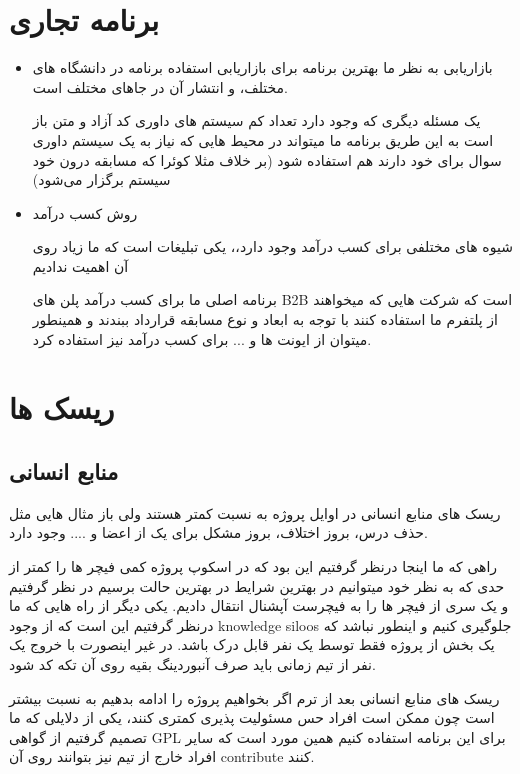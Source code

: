 \documentclass{article}
\begin{document}
		\section{برنامه تجاری}
		\begin{itemize}
			\item بازاریابی
			به نظر ما بهترین برنامه برای بازاریابی استفاده برنامه در دانشگاه های مختلف، و انتشار آن در جاهای مختلف است.
			
			یک مسئله دیگری که وجود دارد تعداد کم سیستم های داوری کد آزاد و متن باز است  به این طریق برنامه ما میتواند در محیط هایی که نیاز به یک سیستم داوری سوال برای خود دارند هم استفاده شود (بر خلاف مثلا کوئرا که مسابقه درون خود سیستم برگزار می‌شود)
			\item روش کسب درآمد
			
			شیوه های مختلفی برای کسب درآمد وجود دارد،، یکی تبلیغات است که ما زیاد روی آن اهمیت ندادیم
			
			برنامه اصلی ما برای کسب درآمد پلن های B2B است که شرکت هایی که میخواهند از پلتفرم ما استفاده کنند با توجه به ابعاد و نوع مسابقه قرارداد ببندند و همینطور میتوان از ایونت ها و ... برای کسب درآمد نیز استفاده کرد.
		\end{itemize}
		
		\section{ریسک ها}
		\subsection{منابع انسانی}
		ریسک های منابع انسانی در اوایل پروژه به نسبت کمتر هستند ولی باز مثال هایی مثل حذف درس، بروز اختلاف، بروز مشکل برای یک از اعضا و .... وجود دارد.
		
		راهی که ما اینجا درنظر گرفتیم این بود که در اسکوپ پروژه کمی فیچر ها را کمتر از حدی که به نظر خود میتوانیم در بهترین شرایط در بهترین حالت برسیم در نظر گرفتیم و یک سری از فیچر ها را به فیچرست آپشنال انتقال دادیم.
		یکی دیگر از راه هایی که ما درنظر گرفتیم این است که از وجود knowledge siloos جلوگیری کنیم و اینطور نباشد که یک بخش از پروژه فقط توسط یک نفر قابل درک باشد. در غیر اینصورت با خروج یک نفر از تیم زمانی باید صرف آنبوردینگ بقیه روی آن تکه کد شود.
		
		ریسک های منابع انسانی بعد از ترم اگر بخواهیم پروژه را ادامه بدهیم به نسبت بیشتر است چون ممکن است افراد حس مسئولیت پذیری کمتری کنند، یکی از دلایلی که ما تصمیم گرفتیم از گواهی GPL برای این برنامه استفاده کنیم همین مورد است که سایر افراد خارج از تیم نیز بتوانند روی آن contribute کنند.
		
\end{document}
